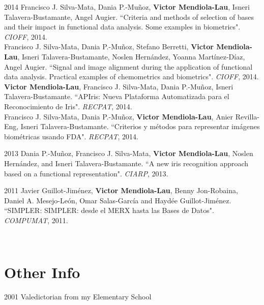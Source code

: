 \documentclass[]{friggeri-cv}
\begin{document}
\begin{entrylist}   
  \entry
    {2014}
    {}
    {}
    {
		Francisco J. Silva-Mata, Dania P.-Muñoz, \textbf{Victor Mendiola-Lau}, Isneri Talavera-Bustamante, Angel Augier. ``Criteria and methods of selection of bases and their impact in functional data analysis. Some examples in biometrics". \emph{CIOFF}, 2014.\\
	
		Francisco J. Silva-Mata, Dania P.-Muñoz, Stefano Berretti, \textbf{Victor Mendiola-Lau}, Isneri Talavera-Bustamante, Noslen Hernández, Yoanna Martínez-Díaz, Angel Augier. ``Signal and image alignment during the application of functional data analysis. Practical examples of chemometrics and biometrics". \emph{CIOFF}, 2014.\\

		\textbf{Victor Mendiola-Lau}, Francisco J. Silva-Mata, Dania P.-Muñoz, Isneri Talavera-Bustamante. ``APIris: Nueva Plataforma Automatizada para el Reconocimiento de Iris". \emph{RECPAT}, 2014.\\

		Francisco J. Silva-Mata, Dania P.-Muñoz, \textbf{Victor Mendiola-Lau}, Anier Revilla-Eng, Isneri Talavera-Bustamante. ``Criterios y métodos para representar imágenes biométricas usando FDA". \emph{RECPAT}, 2014. 
    }
\end{entrylist}

\begin{entrylist}
  \entry
    {2013}
    {}
    {}
    {
		Dania P.-Muñoz, Francisco J. Silva-Mata, \textbf{Victor Mendiola-Lau}, Noslen Hernández, and Isneri Talavera-Bustamante. ``A new iris recognition approach based on a functional representation". \emph{CIARP}, 2013. 
    }
\end{entrylist}

\begin{entrylist}
  \entry
    {2011}
    {}
    {}
    {
		Javier Guillot-Jiménez, \textbf{Victor Mendiola-Lau}, Benny Jon-Robaina, Daniel A. Mesejo-León, Omar Salas-García and Haydée Guillot-Jiménez. ``SIMPLER: SIMPLER: desde el MERX hasta las Bases de Datos". \emph{COMPUMAT}, 2011.   
    }
\end{entrylist}
\\
\section{Other Info}
\begin{entrylist}
  \entry
    {2001}
    {Valedictorian from my Elementary School}
    {}
    {}
\end{entrylist}
\end{document}
